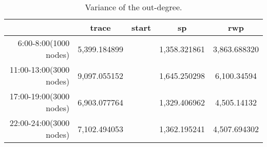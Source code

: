 \begin{table*}[!t]
\caption{Variance of the out-degree.}\label{table_variance_out}
\centering
\begin{tabular}{r|c|c|c|c}
\hline
	&trace	&start	&sp	&rwp\\
\hline
 6:00-8:00(1000 nodes)	&
5,399.184899&&	1,358.321861&	3,863.688320\\
\hline
 11:00-13:00(3000 nodes)&
9,097.055152&&	1,645.250298&	6,100.34594\\
\hline
 17:00-19:00(3000 nodes)&
6,903.077764&&	1,329.406962&	4,505.14132\\
\hline
 22:00-24:00(3000 nodes)&
7,102.494053&&	1,362.195241&	4,507.694302\\
\hline
\end{tabular}
\end{table*}

